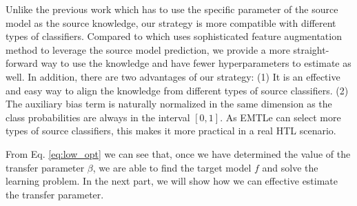 Unlike the previous work\cite{aytar2011tabula,tommasi2014learning,yang2007adapting} which has to use the specific parameter of the source model as the source knowledge, our strategy is more compatible with different types of classifiers. Compared to \cite{jie2011multiclass} which uses sophisticated feature augmentation method to leverage the source model prediction, we provide a more straight-forward way to use the knowledge and have fewer hyperparameters to estimate as well.
In addition, there are two advantages of our strategy: (1) It is an effective and easy way to align the knowledge from different types of source classifiers.
(2) The auxiliary bias term is naturally normalized in the same dimension as the class probabilities are always in the interval $[0,1]$.  As EMTLe can select more types of source classifiers, this makes it more practical in a real HTL scenario.

From Eq. \eqref{eq:low_opt} we can see that, once we have determined the value of the transfer parameter $\beta$, we are able to find the target model $f$ and solve the learning problem. In the next part, we will show how we can effective estimate the transfer parameter.





